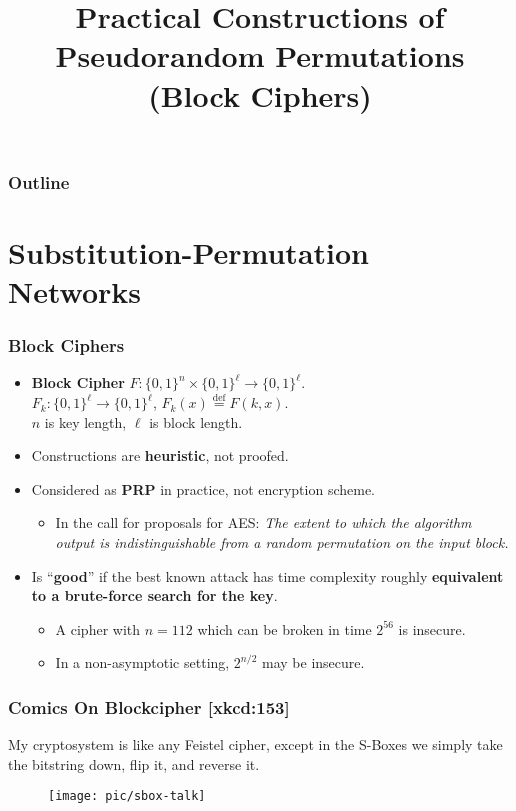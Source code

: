 

\title{Practical Constructions of Pseudorandom Permutations (Block Ciphers)}


\maketitle
\begin{frame}
\frametitle{Outline}
\tableofcontents
\end{frame}
\section{Substitution-Permutation Networks}
\begin{frame}\frametitle{Block Ciphers}
\begin{itemize}
\item \textbf{Block Cipher} $F : \{0,1\}^n \times \{0,1\}^\ell \to \{0,1\}^\ell$. \\
$F_k : \{0,1\}^\ell \to \{0,1\}^\ell$, $F_k(x) \overset{\text{def}}{=} F(k,x)$. \\
$n$ is key length, $\ell$ is block length.
\item Constructions are \textbf{heuristic}, not proofed.
\item Considered as \textbf{PRP} in practice, not encryption scheme.
\begin{itemize}
\item In the call for proposals for AES: 
\emph{The extent to which the algorithm output is indistinguishable from a random permutation on the input block.}
\end{itemize}
\item Is ``\textbf{good}'' if the best known attack has time complexity roughly \textbf{equivalent to a brute-force search for the key}.
\begin{itemize}
\item A cipher with $n=112$ which can be broken in time $2^{56}$ is insecure.
\item In a non-asymptotic setting, $2^{n/2}$ may be insecure.
\end{itemize}
\end{itemize}
\end{frame}
\begin{frame}\frametitle{Comics On Blockcipher [xkcd:153]}
My cryptosystem is like any Feistel cipher, except in the S-Boxes we simply take the bitstring down, flip it, and reverse it.
\begin{figure}
\begin{center}
\texttt{[image: pic/sbox-talk]} 
\end{center}
\end{figure}
\end{frame}
